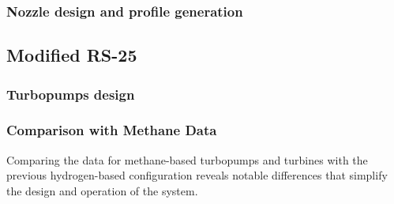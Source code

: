 \subsubsection{Nozzle design and profile generation}
\subsection{Modified RS-25}
\subsubsection{Turbopumps design}
\subsubsection{Comparison with Methane Data}

Comparing the data for methane-based turbopumps and turbines with the previous hydrogen-based configuration reveals notable differences that simplify the design and operation of the system.

